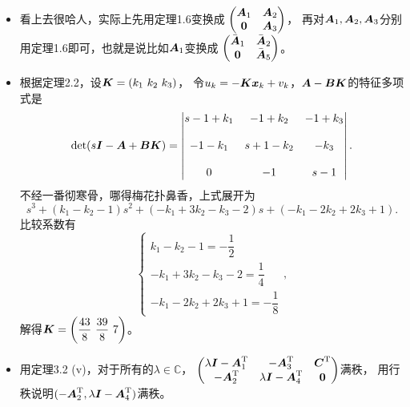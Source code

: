 \begin{itemize}
    \item[19.] 看上去很哈人，实际上先用定理1.6变换成
    $\begin{pmatrix}\boldsymbol{A}_1&\boldsymbol{A}_2\\\boldsymbol{0}&\boldsymbol{A}_3\end{pmatrix}$，
    再对$\boldsymbol{A}_1,\boldsymbol{A}_2,\boldsymbol{A}_3$分别用定理1.6即可，也就是说比如$\boldsymbol{A}_1$变换成
    $\begin{pmatrix}\bar{\boldsymbol{A}}_1&\bar{\boldsymbol{A}}_2\\\boldsymbol{0}&\bar{\boldsymbol{A}}_5\end{pmatrix}$。

    \item[21.] 根据定理2.2，设$\K=(k_1\ k_2\ k_3)$，
    令$u_k=-\boldsymbol{K}\boldsymbol{x}_k+v_k$，$\boldsymbol{A}-\boldsymbol{B}\boldsymbol{K}$的特征多项式是
    \[\det(s\boldsymbol{I}-\boldsymbol{A}+\boldsymbol{B}\boldsymbol{K})=\begin{vmatrix}
        s-1+k_1&-1+k_2&-1+k_3\\ \\
        -1-k_1&s+1-k_2&-k_3\\ \\
        0&-1&s-1
    \end{vmatrix}.\]
    不经一番彻寒骨，哪得梅花扑鼻香，上式展开为
    $$s^3+(k_1-k_2-1)s^2+(-k_1+3k_2-k_3-2)s+(-k_1-2k_2+2k_3+1).$$
    比较系数有
    \[\begin{cases}
        k_1-k_2-1=-\dfrac12\\
        -k_1+3k_2-k_3-2=\dfrac14\\
        -k_1-2k_2+2k_3+1=-\dfrac18
    \end{cases},\]
    解得$\K=\left(\dfrac{43}{8}\ \dfrac{39}{8}\ 7\right)$。

    \item[29.] 用定理3.2 (v)，对于所有的$\lambda\in\mathbb{C}$，
    $\begin{pmatrix}\lambda\boldsymbol{I}-\boldsymbol{A}_1^{\text{T}}&-\boldsymbol{A}_3^{\text{T}}&\boldsymbol{C}^{\text{T}}\\
    -\boldsymbol{A}_2^{\text{T}}&\lambda\boldsymbol{I}-\boldsymbol{A}_4^{\text{T}}&\boldsymbol{0}\end{pmatrix}$满秩，
    用行秩说明$(-\boldsymbol{A}_2^{\text{T}},\lambda\boldsymbol{I}-\boldsymbol{A}_4^{\text{T}})$满秩。


\end{itemize}
